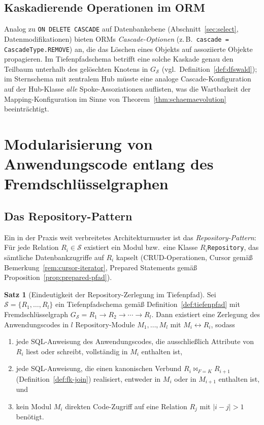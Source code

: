 ﻿\documentclass[a4paper,12pt]{report}
\theoremstyle{definition}
\newtheorem{theorem}{Satz}[chapter]
\theoremstyle{remark}
\begin{document}
\subsection{Kaskadierende Operationen im ORM}

Analog zu \texttt{ON DELETE CASCADE} auf Datenbankebene
(Abschnitt~\ref{sec:select}, Datenmodifikationen) bieten ORMs
\emph{Cascade-Optionen} (z.\,B.\ \texttt{cascade =
CascadeType.REMOVE}) an, die das Löschen eines Objekts auf assoziierte
Objekte propagieren. Im Tiefenpfadschema betrifft eine solche Kaskade
genau den Teilbaum unterhalb des gelöschten Knotens in
$G_{\mathcal{S}}$ (vgl.\ Definition~\ref{def:dfswald}); im
Sternschema mit zentralem Hub müsste eine analoge
Cascade-Konfiguration auf der Hub-Klasse \emph{alle} Spoke-Assoziationen
auflisten, was die Wartbarkeit der Mapping-Konfiguration im Sinne von
Theorem~\ref{thm:schaemaevolution} beeinträchtigt.

\section{Modularisierung von Anwendungscode entlang des Fremdschlüsselgraphen}
\label{sec:modularisierung}

\subsection{Das Repository-Pattern}
\label{sec:repository-pattern}

Ein in der Praxis weit verbreitetes Architekturmuster ist das
\emph{Repository-Pattern}: Für jede Relation $R_i\in\mathcal{S}$
existiert ein Modul bzw.\ eine Klasse \texttt{$R_i$Repository}, das
sämtliche Datenbankzugriffe auf $R_i$ kapselt (CRUD-Operationen,
Cursor gemäß Bemerkung~\ref{rem:cursor-iterator}, Prepared Statements
gemäß Proposition~\ref{prop:prepared-pfad}).

\begin{theorem}[Eindeutigkeit der Repository-Zerlegung im Tiefenpfad]
\label{thm:repository-zerlegung}
Sei $\mathcal{S}=\{R_1,\ldots,R_l\}$ ein Tiefenpfadschema gemäß
Definition~\ref{def:tiefenpfad} mit Fremdschlüsselgraph
$G_{\mathcal{S}}=R_1\to R_2\to\cdots\to R_l$. Dann existiert eine
Zerlegung des Anwendungscodes in $l$ Repository-Module
$M_1,\ldots,M_l$ mit $M_i \leftrightarrow R_i$, sodass
\begin{enumerate}
  \item jede SQL-Anweisung des Anwendungscodes, die ausschließlich
    Attribute von $R_i$ liest oder schreibt, vollständig in $M_i$
    enthalten ist,
  \item jede SQL-Anweisung, die einen kanonischen Verbund
    $R_i\Join_{F=K}R_{i+1}$ (Definition~\ref{def:fk-join}) realisiert,
    entweder in $M_i$ oder in $M_{i+1}$ enthalten ist, und
  \item kein Modul $M_i$ direkten Code-Zugriff auf eine Relation
    $R_j$ mit $|i-j|>1$ benötigt.
\end{enumerate}
\end{theorem}
\end{document}
